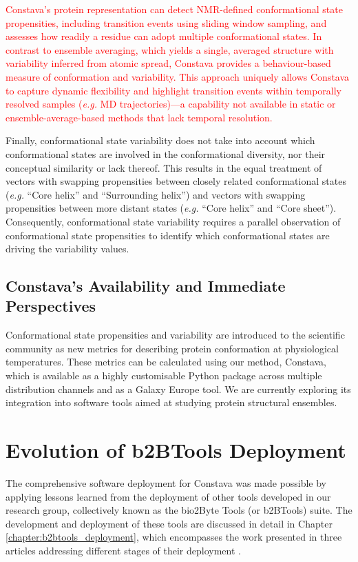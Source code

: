 \textcolor{red}{Constava’s protein representation can detect NMR-defined conformational state propensities, including transition events using sliding window sampling, and assesses how readily a residue can adopt multiple conformational states. In contrast to ensemble averaging, which yields a single, averaged structure with variability inferred from atomic spread, Constava provides a behaviour-based measure of conformation and variability. This approach uniquely allows Constava to capture dynamic flexibility and highlight transition events within temporally resolved samples (\textit{e.g.} MD trajectories)—a capability not available in static or ensemble-average-based methods that lack temporal resolution.}

Finally, conformational state variability does not take into account which conformational states are involved in the conformational diversity, nor their conceptual similarity or lack thereof. This results in the equal treatment of vectors with swapping propensities between closely related conformational states (\textit{e.g.} ``Core helix'' and ``Surrounding helix'') and vectors with swapping propensities between more distant states (\textit{e.g.} ``Core helix'' and ``Core sheet''). Consequently, conformational state variability requires a parallel observation of conformational state propensities to identify which conformational states are driving the variability values.




\subsection{Constava's Availability and Immediate Perspectives}

Conformational state propensities and variability are introduced to the scientific community as new metrics for describing protein conformation at physiological temperatures. These metrics can be calculated using our method, Constava, which is available as a highly customisable Python package across multiple distribution channels and as a Galaxy Europe tool. We are currently exploring its integration into software tools aimed at studying protein structural ensembles.


\section{Evolution of b2BTools Deployment}

The comprehensive software deployment for Constava was made possible by applying lessons learned from the deployment of other tools developed in our research group, collectively known as the bio2Byte Tools (or b2BTools) suite. The development and deployment of these tools are discussed in detail in Chapter \ref{chapter:b2btools_deployment}, which encompasses the work presented in three articles addressing different stages of their deployment \cite{kagami_online_2021, kagami_b2btools_2021, gavalda-garcia_bio2byte_2024}. 


